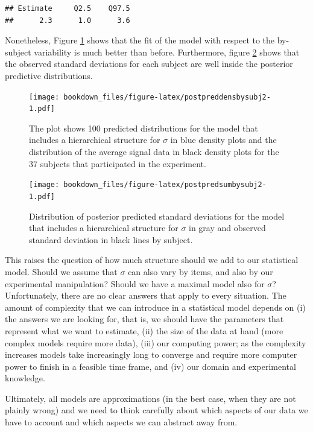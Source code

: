 \documentclass[12pt,]{krantz}
\theoremstyle{definition}
\theoremstyle{definition}
\theoremstyle{definition}
\theoremstyle{remark}
\begin{document}
\begin{verbatim}
## Estimate     Q2.5    Q97.5 
##      2.3      1.0      3.6
\end{verbatim}

Nonetheless, Figure \ref{fig:postpreddensbysubj2} shows that the fit of the model with respect to the by-subject variability is much better than before. Furthermore, figure \ref{fig:postpredsumbysubj2} shows that the observed standard deviations for each subject are well inside the posterior predictive distributions.



\begin{figure}
\centering
\texttt{[image: bookdown\_files/figure-latex/postpreddensbysubj2-1.pdf]}
\caption{\label{fig:postpreddensbysubj2}The plot shows 100 predicted distributions for the model that includes a hierarchical structure for \(\sigma\) in blue density plots and the distribution of the average signal data in black density plots for the 37 subjects that participated in the experiment.}
\end{figure}



\begin{figure}
\centering
\texttt{[image: bookdown\_files/figure-latex/postpredsumbysubj2-1.pdf]}
\caption{\label{fig:postpredsumbysubj2}Distribution of posterior predicted standard deviations for the model that includes a hierarchical structure for \(\sigma\) in gray and observed standard deviation in black lines by subject.}
\end{figure}

This raises the question of how much structure should we add to our statistical model. Should we assume that \(\sigma\) can also vary by items, and also by our experimental manipulation? Should we have a maximal model also for \(\sigma\)? Unfortunately, there are no clear answers that apply to every situation. The amount of complexity that we can introduce in a statistical model depends on (i) the answers we are looking for, that is, we should have the parameters that represent what we want to estimate, (ii) the size of the data at hand (more complex models require more data), (iii) our computing power; as the complexity increases models take increasingly long to converge and require more computer power to finish in a feasible time frame, and (iv) our domain and experimental knowledge.

Ultimately, all models are approximations (in the best case, when they are not plainly wrong) and we need to think carefully about which aspects of our data we have to account and which aspects we can abstract away from.
\end{document}
